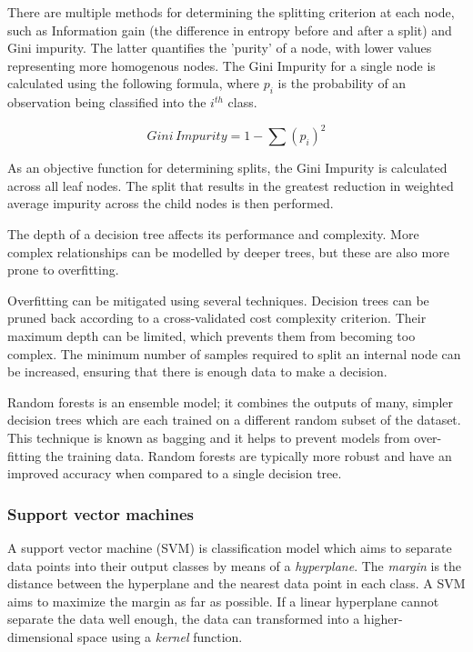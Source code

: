 There are multiple methods for determining the splitting criterion at each node, such as Information gain (the difference in entropy before and after a split) and Gini impurity. The latter quantifies the 'purity' of a node, with lower values representing more homogenous nodes. The Gini Impurity for a single node is calculated using the following formula, where $p_i$ is the probability of an observation being classified into the $i^{th}$ class.

\begin{equation}
Gini\, Impurity = 1 - \sum (p_i)^2
\end{equation}

As an objective function for determining splits, the Gini Impurity is calculated across all leaf nodes. The split that results in the greatest reduction in weighted average impurity across the child nodes is then performed. 

The depth of a decision tree affects its performance and complexity. More complex relationships can be modelled by deeper trees, but these are also more prone to overfitting. 

Overfitting can be mitigated using several techniques. Decision trees can be pruned back according to a cross-validated cost complexity criterion. Their maximum depth can be limited, which prevents them from becoming too complex. The minimum number of samples required to split an internal node can be increased, ensuring that there is enough data to make a decision.

Random forests \cite{randomforests} is an ensemble model; it combines the outputs of many, simpler decision trees which are each trained on a different random subset of the dataset. This technique is known as bagging and it helps to prevent models from over-fitting the training data. Random forests are typically more robust and have an improved accuracy when compared to a single decision tree. 

\subsubsection{Support vector machines}

A support vector machine (SVM) \cite{svm} is classification model which aims to separate data points into their output classes by means of a \textit{hyperplane}. The \textit{margin} is the distance between the hyperplane and the nearest data point in each class. A SVM aims to maximize the margin as far as possible. If a linear hyperplane cannot separate the data well enough, the data can transformed into a higher-dimensional space using a \textit{kernel} function.

